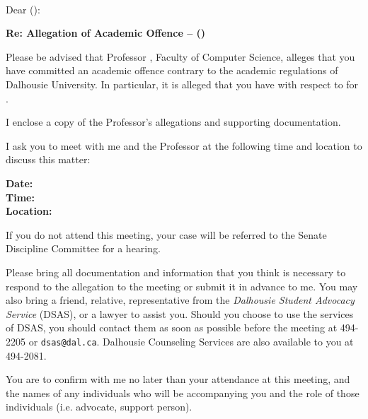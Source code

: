 \documentclass[11pt]{dalcsletter}
\begin{document}
\begin{letter}{ \Student\\ \Address}

\vspace*{-15mm} %
\opening{Dear \Student{} (\Banner):}
\begin{center}
\large \bf Re: Allegation of Academic Offence – (\Student)
\end{center}

Please be advised that Professor \Professor, Faculty of Computer
Science, alleges that you have committed an academic offence contrary
to the academic regulations of Dalhousie University. In particular,
it is alleged that you have \Allegation{} with respect to \Work{} for
\Class{}.

I enclose a copy of the Professor's allegations and supporting
documentation.

I ask you to meet with me and the Professor at the following time
and location to discuss this matter:

\begin{center}
\bf\large
Date: \MeetDate\\
Time: \MeetTime\\
Location: \MeetLocation
\end{center}

If you do not attend this meeting, your case will be referred to
the Senate Discipline Committee for a hearing.


Please bring all documentation and information that you think is
necessary to respond to the allegation to the meeting or submit it
in advance to me. You may also bring a friend, relative, representative
from the {\em Dalhousie Student Advocacy Service} (DSAS), or a
lawyer to assist you. Should you choose to use the services of DSAS,
you should contact them as soon as possible before the meeting at
494-2205 or {\tt dsas@dal.ca}. Dalhousie Counseling Services are
also available to you at 494-2081.

You are to confirm with me no later than \ConfirmDate{} your attendance
at this meeting, and the names of any individuals who will be
accompanying you and the role of those individuals (i.e. advocate,
support person).


\end{letter}
\end{document}
